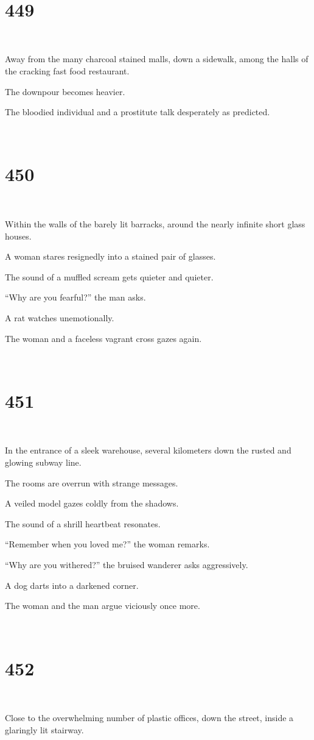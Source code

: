 \documentclass{report}
\begin{document}
~
\chapter*{449}
~

Away from the many charcoal stained malls, down a sidewalk, among the halls of the cracking fast food restaurant.

The downpour becomes heavier.

The bloodied individual and a prostitute talk desperately as predicted.

~
\chapter*{450}
~

Within the walls of the barely lit barracks, around the nearly infinite short glass houses.

A woman stares resignedly into a stained pair of glasses.

The sound of a muffled scream gets quieter and quieter.

``Why are you fearful?'' the man asks.

A rat watches unemotionally.

The woman and a faceless vagrant cross gazes again.

~
\chapter*{451}
~

In the entrance of a sleek warehouse, several kilometers down the rusted and glowing subway line.

The rooms are overrun with strange messages.

A veiled model gazes coldly from the shadows.

The sound of a shrill heartbeat resonates.

``Remember when you loved me?'' the woman remarks.

``Why are you withered?'' the bruised wanderer asks aggressively.

A dog darts into a darkened corner.

The woman and the man argue viciously once more.

~
\chapter*{452}
~

Close to the overwhelming number of plastic offices, down the street, inside a glaringly lit stairway.
\end{document}

